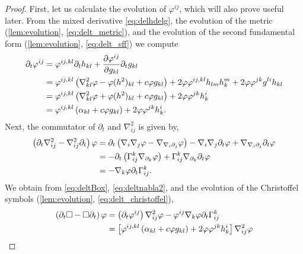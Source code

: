 \documentclass{amsart}
\begin{document}
\begin{proof}
First, let us calculate the evolution of \(\varphi^{ij}\), which will also prove useful later. From the mixed derivative \cref{eq:delhdelg}, the evolution of the metric (\cref{lem:evolution}, \cref{eq:delt_metric}), and the evolution of the second fundamental form (\cref{lem:evolution}, \cref{eq:delt_sff}) we compute
\begin{equation}
\label{eq:deltBox}
\begin{split}
\partial_{t} \varphi^{ij} &= \varphi^{ij,kl} \partial_t h_{kl} + \frac{\partial\varphi^{ij}}{\partial g_{kl}} \partial_t g_{kl} \\
&= \varphi^{ij,kl} \left(\nabla^2_{kl} \varphi - \varphi(h^2)_{kl} + c \varphi g_{kl}\right) + 2\varphi \varphi^{ij,kl} h_{lm}h^{m}_{k} + 2\varphi\varphi^{jk}g^{li}h_{kl} \\
&= \varphi^{ij,kl} \left(\nabla^2_{kl} \varphi + \varphi(h^2)_{kl} + c \varphi g_{kl}\right) + 2\varphi\varphi^{jk}h^{i}_{k} \\
&= \varphi^{ij,kl} \left(\alpha_{kl} + c \varphi g_{kl}\right) + 2\varphi\varphi^{jk}h^{i}_{k}.
\end{split}
\end{equation}
Next, the commutator of \(\partial_t\) and \(\nabla^2_{ij}\) is given by,
\begin{equation}
\label{eq:deltnabla2}
\begin{split}
\left(\partial_{t}\nabla^2_{ij} - \nabla^2_{ij}\partial_{t}\right) \varphi &= \partial_t \left(\nabla_i \nabla_j \varphi - \nabla_{\nabla_i \partial_j} \varphi\right) - \nabla_i \nabla_j \partial_t \varphi + \nabla_{\nabla_i \partial_j} \partial_t \varphi \\
&= - \partial_t \left(\Gamma_{ij}^k \nabla_{\partial_k} \varphi\right) + \Gamma_{ij}^k \nabla_{\partial_k} \partial_t \varphi \\
&= - \nabla_k \varphi \partial_t \Gamma_{ij}^k.
\end{split}
\end{equation}
We obtain from \cref{eq:deltBox}, \cref{eq:deltnabla2}, and the evolution of the Christoffel symbols (\cref{lem:evolution}, \cref{eq:delt_christoffel}),
\[
\begin{split}
\left(\partial_{t}\Box - \Box\partial_{t}\right) \varphi &= \left(\partial_{t}\varphi^{ij}\right) \nabla^2_{ij} \varphi - \varphi^{ij}\nabla_k \varphi\partial_t \G^{k}_{ij} \\
&= \left[\varphi^{ij,kl} \left(\a_{kl} + c \varphi g_{kl}\right) + 2\varphi\varphi^{jk}h^{i}_{k}\right] \nabla^2_{ij} \varphi \\

\end{split}\]
\end{proof}
\end{document}
